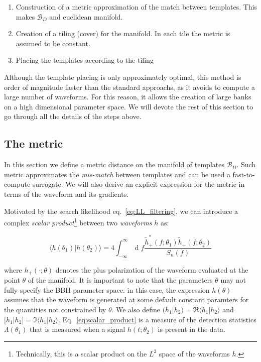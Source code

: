 \documentclass[twocolumn,showpacs,preprintnumbers,nofootinbib,prd,
superscriptaddress,10pt]{revtex4-2}
\renewcommand{\d}[1]{\ensuremath{\operatorname{d}\!{#1}}}
\newcommand{\scalar}[2]{\langle #1|#2 \rangle}
\newcommand{\rescalar}[2]{( #1|#2 )}
\newcommand{\imscalar}[2]{[ #1|#2 ]}
\begin{document}
\begin{enumerate}
	\item Construction of a metric approximation of the match between templates. This makes $\mathcal{B}_D$ and euclidean manifold.
	\item Creation of a tiling (cover) for the manifold. In each tile the metric is assumed to be constant.
	\item Placing the templates according to the tiling
\end{enumerate}

Although the template placing is only approximately optimal, this method is order of magnitude faster than the standard approachs, as it avoids to compute a large number of waveforms. For this reason, it allows the creation of large banks on a high dimensional parameter space.
We will devote the rest of this section to go through all the details of the steps above.

\subsection{The metric} \label{sec:metric}

In this section we define a metric distance on the manifold of templates $\mathcal{B}_D$. Such metric approximates the {\it mis-match} between templates and can be used a fast-to-compute surrogate. We will also derive an explicit expression for the metric in terms of the waveform and its gradients.

Motivated by the search likelihood eq.~\eqref{eq:LL_filtering}, we can introduce a complex \textit{scalar product}\footnote{
Technically, this is a scalar product on the $L^2$ space of the waveforms $h$.
} between two \textit{waveforms} $h$ as:

\begin{equation} \label{eq:scalar_product}
	\scalar{h(\theta_1)}{h(\theta_2)} = 4 \int_{-\infty}^{\infty} \d{f} \frac{\tilde{h}_+^*(f;\theta_1) \tilde{h}_+(f;\theta_2)}{S_n(f)}
\end{equation}

where $h_+(\cdot; \theta)$ denotes the plus polarization of the waveform evaluated at the point $\theta$ of the manifold.
It is important to note that the parameters $\theta$ may not fully specify the BBH parameter space: in this case, the expression $h(\theta)$ assumes that the waveform is generated at some default constant paramters for the quantities not constrained by $\theta$.
We also define $\rescalar{h_1}{h_2} = \Re\scalar{h_1}{h_2}$ and $\imscalar{h_1}{h_2} = \Im\scalar{h_1}{h_2}$.
Eq.~\eqref{eq:scalar_product} is a measure of the detection statistics $\Lambda(\theta_1)$ that is measured when a signal $h(t; \theta_2)$ is present in the data.
\end{document}
